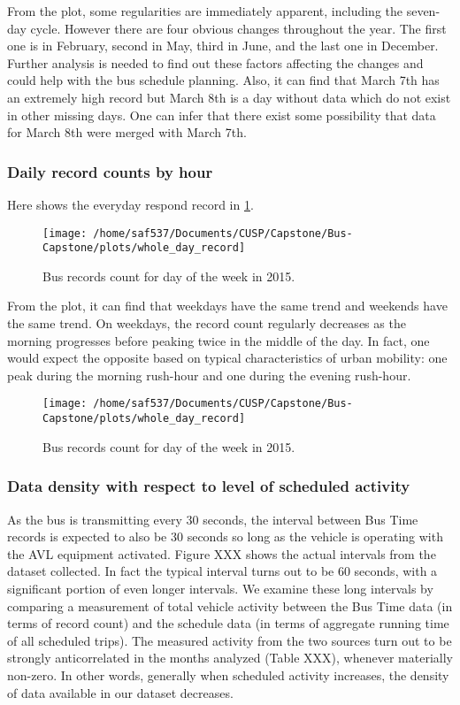 \documentclass[12pt]{report}
\begin{document}
From the plot, some regularities are immediately apparent, including the seven-day cycle. However there are four obvious changes throughout the year. The first one is in February, second in May, third in June, and the last one in December. Further analysis is needed to find out these factors affecting the changes and could help with the bus schedule planning. Also, it can find that March 7th has an extremely high record but March 8th is a day without data which do not exist in other missing days. One can infer that there exist some possibility that data for March 8th were merged with March 7th.
      
      \subsubsection*{Daily record counts by hour}
      
       Here shows the everyday respond record in \ref{week}.

\begin{figure}[!ht]
	\label{week}
  \caption{Bus records count for day of the week in 2015.}
  \centering
    \texttt{[image: /home/saf537/Documents/CUSP/Capstone/Bus-Capstone/plots/whole\_day\_record]}
\end{figure}

From the plot, it can find that weekdays have the same trend and weekends have the same trend.   On weekdays, the record count regularly decreases as the morning progresses before peaking twice in the middle of the day.  In fact, one would expect the opposite based on typical characteristics of urban mobility: one peak during the morning rush-hour and one during the evening rush-hour.

\begin{figure}[!ht]
\label{week_day}
  \caption{Bus records count for day of the week in 2015.}
  \centering
    \texttt{[image: /home/saf537/Documents/CUSP/Capstone/Bus-Capstone/plots/whole\_day\_record]}
\end{figure}
      
      \subsubsection*{Data density with respect to level of scheduled activity}
      
       
   As the bus is transmitting every 30 seconds, the interval between Bus Time records is expected to also be 30 seconds so long as the vehicle is operating with the AVL equipment activated.  Figure XXX shows the actual intervals from the dataset collected.  In fact the typical interval turns out to be 60 seconds, with a significant portion of even longer intervals.  We examine these long intervals by comparing a measurement of total vehicle activity between the Bus Time data (in terms of record count) and the schedule data (in terms of aggregate running time of all scheduled trips). The measured activity from the two sources turn out to be strongly anticorrelated in the months analyzed (Table XXX), whenever materially non-zero.  In other words, generally when scheduled activity increases, the density of data available in our dataset decreases.
   
\end{document}
